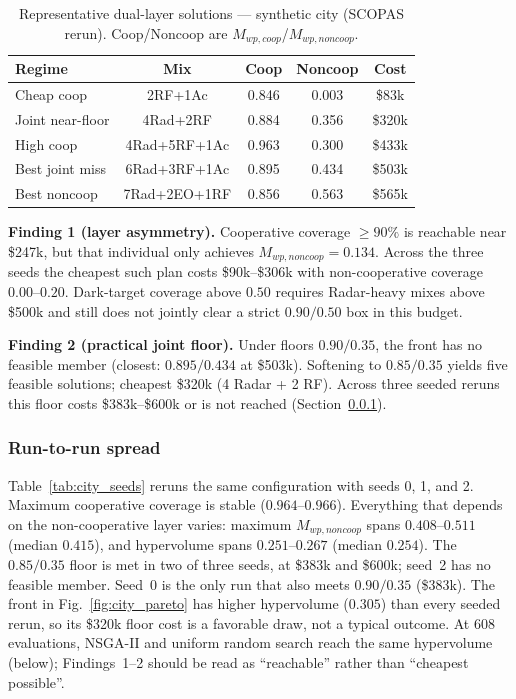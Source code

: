 \begin{table}[h]
\centering
\caption{Representative dual-layer solutions — synthetic city (SCOPAS rerun). Coop/Noncoop are \(M_{wp,coop}\)/\(M_{wp,noncoop}\).}
\label{tab:city_dual}
\footnotesize
\setlength{\tabcolsep}{3pt}
\begin{tabular}{lcccc}
\toprule
\textbf{Regime} & \textbf{Mix} & \textbf{Coop} & \textbf{Noncoop} & \textbf{Cost} \\
\midrule
Cheap coop & 2RF+1Ac & 0.846 & 0.003 & \$83k \\
Joint near-floor & 4Rad+2RF & 0.884 & 0.356 & \$320k \\
High coop & 4Rad+5RF+1Ac & 0.963 & 0.300 & \$433k \\
Best joint miss & 6Rad+3RF+1Ac & 0.895 & 0.434 & \$503k \\
Best noncoop & 7Rad+2EO+1RF & 0.856 & 0.563 & \$565k \\
\bottomrule
\end{tabular}
\end{table}

\textbf{Finding 1 (layer asymmetry).}
Cooperative coverage \(\geq90\%\) is reachable near \$247k, but that individual only achieves \(M_{wp,noncoop}=0.134\). Across the three seeds the cheapest such plan costs \$90k--\$306k with non-cooperative coverage \(0.00\)--\(0.20\). Dark-target coverage above \(0.50\) requires Radar-heavy mixes above \$500k and still does not jointly clear a strict \(0.90/0.50\) box in this budget.

\textbf{Finding 2 (practical joint floor).}
Under floors \(0.90/0.35\), the front has no feasible member (closest: \(0.895/0.434\) at \$503k). Softening to \(0.85/0.35\) yields five feasible solutions; cheapest \$320k (4 Radar + 2 RF). Across three seeded reruns this floor costs \$383k--\$600k or is not reached (Section~\ref{sec:results_seeds}).

\subsubsection{Run-to-run spread}
\label{sec:results_seeds}

Table~\ref{tab:city_seeds} reruns the same configuration with seeds 0, 1, and 2. Maximum cooperative coverage is stable (\(0.964\)--\(0.966\)). Everything that depends on the non-cooperative layer varies: maximum \(M_{wp,noncoop}\) spans \(0.408\)--\(0.511\) (median \(0.415\)), and hypervolume spans \(0.251\)--\(0.267\) (median \(0.254\)). The \(0.85/0.35\) floor is met in two of three seeds, at \$383k and \$600k; seed~2 has no feasible member. Seed~0 is the only run that also meets \(0.90/0.35\) (\$383k). The front in Fig.~\ref{fig:city_pareto} has higher hypervolume (\(0.305\)) than every seeded rerun, so its \$320k floor cost is a favorable draw, not a typical outcome. At 608 evaluations, NSGA-II and uniform random search reach the same hypervolume (below); Findings~1--2 should be read as ``reachable'' rather than ``cheapest possible''.

